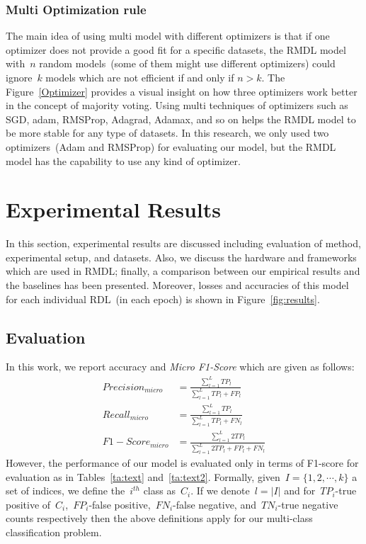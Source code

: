 \documentclass[sigconf, final]{acmart}
\begin{document}
\subsubsection{Multi Optimization rule}
The main idea of using multi model with different optimizers is that if one optimizer does not provide a good fit for a specific datasets, the RMDL model with~$n$ random models~(some of them might use different optimizers) could ignore~$k$ models which are not efficient if and only if $n>k$. The Figure~\ref{Optimizer} provides a visual insight on how three optimizers work better in the concept of majority voting. Using multi techniques of optimizers such as SGD, adam, RMSProp, Adagrad, Adamax, and so on helps the RMDL model to be more stable for any type of datasets. In this research, we only used two optimizers~(Adam and RMSProp) for evaluating our model, but the RMDL model has the capability to use any kind of optimizer.  




\section{Experimental Results}\label{sec:results}
In this section, experimental results are discussed including evaluation of method, experimental setup, and datasets. Also, we discuss the hardware and frameworks which are used in RMDL; finally, a comparison between our empirical results and the baselines has been presented. Moreover, losses and accuracies of this model for each individual RDL~(in each epoch) is shown in Figure~\ref{fig:results}.

\subsection{Evaluation}\label{subsec:Evaluation}
In this work, we report accuracy and \textit{Micro F1-Score} which are given as follows:
\begin{align}
Precision_{micro} &= \frac{\sum_{l=1}^LTP_l}{\sum_{l=1}^LTP_l+FP_l}\\
Recall_{micro} &= \frac{\sum_{l=1}^LTP_l}{\sum_{l=1}^LTP_l+FN_l}\\
F1-Score_{micro} &=  \frac{\sum_{l=1}^L2TP_l}{\sum_{l=1}^L2TP_l+FP_l+FN_l}
\end{align}
However, the performance of our model is evaluated only in terms of F1-score for evaluation as in Tables~\ref{ta:text} and~\ref{ta:text2}.
Formally, given~$I = \{1,2,\cdots, k\}$ a set of indices, we define the~$i^{th}$ class as~$C_i$. If we denote~$l = |I|$ and for~$TP_i$-true positive of~$C_i$,~$FP_i$-false
positive,~$FN_i$-false negative, and~$TN_i$-true negative counts respectively then the above definitions apply for our multi-class classification problem.
\end{document}
